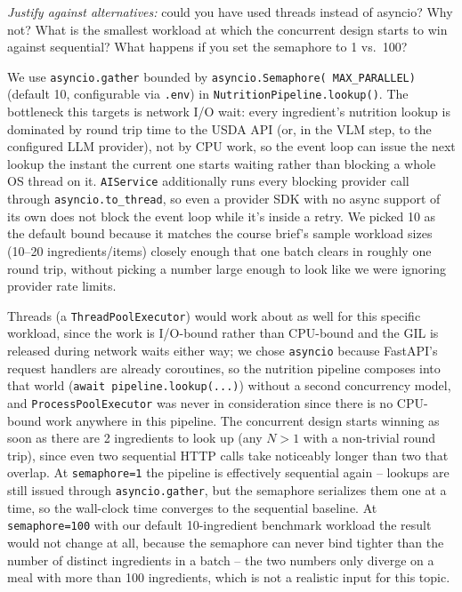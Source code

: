 \documentclass[11pt,a4paper]{article}
\newenvironment{probebox}{\begin{probeboxshown}}{\end{probeboxshown}}
\newenvironment{probebox}{\setbox0\vbox\bgroup}{\egroup\ignorespacesafterend}
\begin{document}
\begin{probebox}
\textit{Justify against alternatives:} could you have used threads instead of asyncio? Why not? What is the smallest workload at which the concurrent design starts to win against sequential? What happens if you set the semaphore to 1 vs.\ 100?
\end{probebox}

\par\noindent
We use \texttt{asyncio.gather} bounded by \texttt{asyncio.Semaphore(
MAX\_PARALLEL)} (default 10, configurable via \texttt{.env}) in
\texttt{NutritionPipeline.lookup()}. The bottleneck this targets is
network I/O wait: every ingredient's nutrition lookup is dominated by round
trip time to the USDA API (or, in the VLM step, to the configured LLM
provider), not by CPU work, so the event loop can issue the next lookup the
instant the current one starts waiting rather than blocking a whole OS
thread on it. \texttt{AIService} additionally runs every blocking provider
call through \texttt{asyncio.to\_thread}, so even a provider SDK with no
async support of its own does not block the event loop while it's inside a
retry. We picked 10 as the default bound because it matches the course
brief's sample workload sizes (10--20 ingredients/items) closely enough that
one batch clears in roughly one round trip, without picking a number large
enough to look like we were ignoring provider rate limits.

\par\noindent
Threads (a \texttt{ThreadPoolExecutor}) would work about as well for this
specific workload, since the work is I/O-bound rather than CPU-bound and
the GIL is released during network waits either way; we chose
\texttt{asyncio} because FastAPI's request handlers are already coroutines,
so the nutrition pipeline composes into that world (\texttt{await
pipeline.lookup(...)}) without a second concurrency model, and
\texttt{ProcessPoolExecutor} was never in consideration since there is no
CPU-bound work anywhere in this pipeline. The concurrent design starts
winning as soon as there are 2 ingredients to look up (any $N > 1$ with a
non-trivial round trip), since even two sequential HTTP calls take
noticeably longer than two that overlap. At \texttt{semaphore=1} the
pipeline is effectively sequential again -- lookups are still issued through
\texttt{asyncio.gather}, but the semaphore serializes them one at a time, so
the wall-clock time converges to the sequential baseline. At
\texttt{semaphore=100} with our default 10-ingredient benchmark workload the
result would not change at all, because the semaphore can never bind tighter
than the number of distinct ingredients in a batch -- the two numbers only
diverge on a meal with more than 100 ingredients, which is not a realistic
input for this topic.
\end{document}
